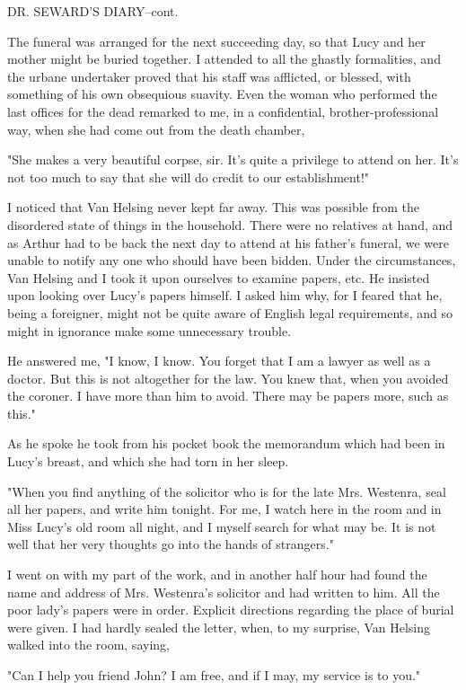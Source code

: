 DR. SEWARD'S DIARY--cont. 

The funeral was arranged for the next succeeding day, so that Lucy and her mother might be buried together. I attended to all the ghastly formalities, and the urbane undertaker proved that his staff was afflicted, or blessed, with something of his own obsequious suavity. Even the woman who performed the last offices for the dead remarked to me, in a confidential, brother-professional way, when she had come out from the death chamber, 

"She makes a very beautiful corpse, sir. It's quite a privilege to attend on her. It's not too much to say that she will do credit to our establishment!" 

I noticed that Van Helsing never kept far away. This was possible from the disordered state of things in the household. There were no relatives at hand, and as Arthur had to be back the next day to attend at his father's funeral, we were unable to notify any one who should have been bidden. Under the circumstances, Van Helsing and I took it upon ourselves to examine papers, etc. He insisted upon looking over Lucy's papers himself. I asked him why, for I feared that he, being a foreigner, might not be quite aware of English legal requirements, and so might in ignorance make some unnecessary trouble. 

He answered me, "I know, I know. You forget that I am a lawyer as well as a doctor. But this is not altogether for the law. You knew that, when you avoided the coroner. I have more than him to avoid. There may be papers more, such as this." 

As he spoke he took from his pocket book the memorandum which had been in Lucy's breast, and which she had torn in her sleep. 

"When you find anything of the solicitor who is for the late Mrs. Westenra, seal all her papers, and write him tonight. For me, I watch here in the room and in Miss Lucy's old room all night, and I myself search for what may be. It is not well that her very thoughts go into the hands of strangers." 

I went on with my part of the work, and in another half hour had found the name and address of Mrs. Westenra's solicitor and had written to him. All the poor lady's papers were in order. Explicit directions regarding the place of burial were given. I had hardly sealed the letter, when, to my surprise, Van Helsing walked into the room, saying, 

"Can I help you friend John? I am free, and if I may, my service is to you." 

